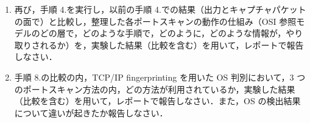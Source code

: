 \documentclass[dvipdfmx,autodetect-engine, 12pt]{jsarticle}
\begin{document}
\begin{enumerate}[label=(\arabic*)]
\begin{enumerate}[label=\arabic*]
        ヒント：TCP stream でログイン時のパケット内の情報について確認する
        \item 再び，手順 4.を実行し，以前の手順 4.での結果（出力とキャプチャパケットの面で）と比較し，整理した各ポートスキャンの動作の仕組み（OSI 参照モデルのどの層で，どのような手順で，どのように，どのような情報が，やり取りされるか）を，実験した結果（比較を含む）を用いて，レポートで報告しなさい．
        \item 手順 8.の比較の内，TCP/IP fingerprinting を用いた OS 判別において，3 つのポートスキャン方法の内，どの方法が利用されているか，実験した結果（比較を含む）を用いて，レポートで報告しなさい．また，OS の検出結果について違いが起きたか報告しなさい．
    \end{enumerate}
\end{enumerate}

\newpage

\printbibliography[title=参考文献]
\end{document}
